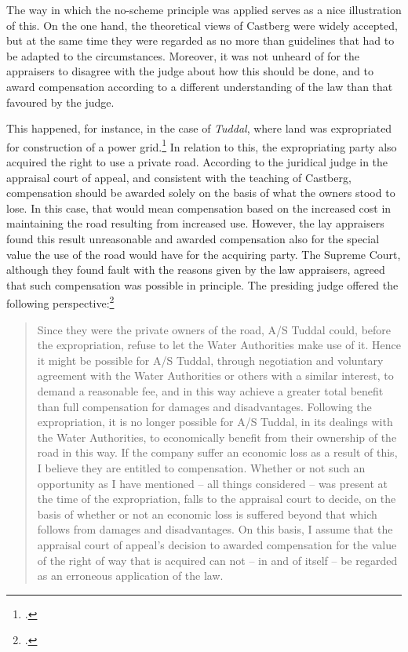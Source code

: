 The way in which the no-scheme principle was applied serves as a nice illustration of this. On the one hand, the theoretical views of Castberg were widely accepted, but at the same time they were regarded as no more than guidelines that had to be adapted to the circumstances. Moreover, it was not unheard of for the appraisers to disagree with the judge about how this should be done, and to award compensation according to a different understanding of the law than that favoured by the judge. 

This happened, for instance, in the case of \emph{Tuddal}, where land was expropriated for construction of a power grid.\footcite{tuddal56} In relation to this, the expropriating party also acquired the right to use a private road. According to the juridical judge in the appraisal court of appeal, and consistent with the teaching of Castberg, compensation should be awarded solely on the basis of what the owners stood to lose. In this case, that would mean compensation based on the increased cost in maintaining the road resulting from increased use. However, the lay appraisers found this result unreasonable and awarded compensation also for the special value the use of the road would have for the acquiring party. The Supreme Court, although they found fault with the reasons given by the law appraisers, agreed that such compensation was possible in principle. The presiding judge offered the following perspective:\footcite[111]{tuddal56}

\begin{quote}
Since they were the private owners of the road, A/S Tuddal could, before the expropriation, refuse to let the Water Authorities make use of it. Hence it might be possible for A/S Tuddal, through negotiation and voluntary agreement with the Water Authorities or others with a similar interest, to demand a reasonable fee, and in this way achieve a greater total benefit than full compensation for damages and disadvantages. Following the expropriation, it is no longer possible for A/S Tuddal, in its dealings with the Water Authorities, to economically benefit from their ownership of the road in this way. If the company suffer an economic loss as a result of this, I believe they are entitled to compensation. Whether or not such an opportunity as I have mentioned -- all things considered -- was present at the time of the expropriation, falls to the appraisal court to decide, on the basis of whether or not an economic loss is suffered beyond that which follows from damages and disadvantages. On this basis, I assume that the appraisal court of appeal's decision to awarded compensation for the value of the right of way that is acquired can not -- in and of itself -- be regarded as an erroneous application of the law.
\end{quote}

